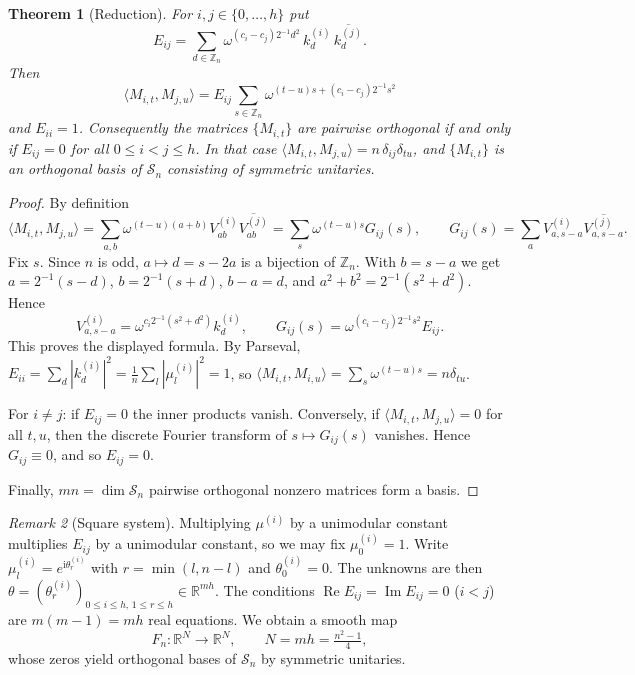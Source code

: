 \documentclass[11pt]{amsart}
\newtheorem{theorem}{Theorem}
\theoremstyle{definition}
\theoremstyle{remark}
\newtheorem{remark}[theorem]{Remark}
\newcommand{\Z}{\mathbb{Z}}
\newcommand{\R}{\mathbb{R}}
\newcommand{\Sym}{\mathcal{S}}
\newcommand{\ip}[2]{\langle #1,#2\rangle}
\begin{document}
\begin{theorem}[Reduction]\label{thm:reduction}
For $i,j\in\{0,\dots,h\}$ put
\[
E_{ij}=\sum_{d\in\Z_n}\omega^{(c_i-c_j)2^{-1}d^2}\,k^{(i)}_d\,\overline{k^{(j)}_d}.
\]
Then
\[
\ip{M_{i,t}}{M_{j,u}}=E_{ij}\sum_{s\in\Z_n}\omega^{(t-u)s+(c_i-c_j)2^{-1}s^2}
\]
and $E_{ii}=1$. Consequently the matrices $\{M_{i,t}\}$ are pairwise orthogonal if and only if $E_{ij}=0$ for all $0\le i<j\le h$. In that case $\ip{M_{i,t}}{M_{j,u}}=n\,\delta_{ij}\delta_{tu}$, and $\{M_{i,t}\}$ is an orthogonal basis of $\Sym_n$ consisting of symmetric unitaries.
\end{theorem}

\begin{proof}
By definition
\[
\ip{M_{i,t}}{M_{j,u}}=\sum_{a,b}\omega^{(t-u)(a+b)}V^{(i)}_{ab}\overline{V^{(j)}_{ab}}=\sum_{s}\omega^{(t-u)s}G_{ij}(s),\qquad G_{ij}(s)=\sum_{a}V^{(i)}_{a,s-a}\overline{V^{(j)}_{a,s-a}}.
\]
Fix $s$. Since $n$ is odd, $a\mapsto d=s-2a$ is a bijection of $\Z_n$. With $b=s-a$ we get $a=2^{-1}(s-d)$, $b=2^{-1}(s+d)$, $b-a=d$, and $a^2+b^2=2^{-1}(s^2+d^2)$. Hence
\[
V^{(i)}_{a,s-a}=\omega^{c_i2^{-1}(s^2+d^2)}k^{(i)}_d,
\qquad
G_{ij}(s)=\omega^{(c_i-c_j)2^{-1}s^2}E_{ij}.
\]
This proves the displayed formula. By Parseval, $E_{ii}=\sum_d|k^{(i)}_d|^2=\frac1n\sum_l|\mu^{(i)}_l|^2=1$, so $\ip{M_{i,t}}{M_{i,u}}=\sum_s\omega^{(t-u)s}=n\delta_{tu}$.

For $i\ne j$: if $E_{ij}=0$ the inner products vanish. Conversely, if $\ip{M_{i,t}}{M_{j,u}}=0$ for all $t,u$, then the discrete Fourier transform of $s\mapsto G_{ij}(s)$ vanishes. Hence $G_{ij}\equiv0$, and so $E_{ij}=0$.

Finally, $mn=\dim\Sym_n$ pairwise orthogonal nonzero matrices form a basis.
\end{proof}

\begin{remark}[Square system]\label{rem:square}
Multiplying $\mu^{(i)}$ by a unimodular constant multiplies $E_{ij}$ by a unimodular constant, so we may fix $\mu^{(i)}_0=1$. Write $\mu^{(i)}_l=e^{\mathrm i\theta^{(i)}_{r}}$ with $r=\min(l,n-l)$ and $\theta^{(i)}_0=0$. The unknowns are then $\theta=(\theta^{(i)}_r)_{0\le i\le h,\,1\le r\le h}\in\R^{mh}$. The conditions $\operatorname{Re}E_{ij}=\operatorname{Im}E_{ij}=0$ ($i<j$) are $m(m-1)=mh$ real equations. We obtain a smooth map
\[
F_n:\R^N\to\R^N,\qquad N=mh=\tfrac{n^2-1}{4},
\]
whose zeros yield orthogonal bases of $\Sym_n$ by symmetric unitaries.
\end{remark}
\end{document}
